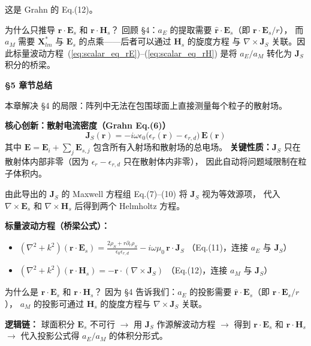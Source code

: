 这是 Grahn 的 Eq.(12)。

\begin{stepbox}{为什么只推导 $\mathbf{r}\cdot\mathbf{E}_s$ 和 $\mathbf{r}\cdot\mathbf{H}_s$？}
回顾 \S4：$a_E$ 的提取需要 $\hat{\mathbf{r}}\cdot\mathbf{E}_s$（即 $\mathbf{r}\cdot\mathbf{E}_s/r$），
而 $a_M$ 需要 $\mathbf{X}_{lm}^*$ 与 $\mathbf{E}_s$ 的点乘——后者可以通过 $\mathbf{H}_s$ 的旋度方程
与 $\nabla\times\mathbf{J}_S$ 关联。因此标量波动方程~(\ref{eq:scalar_eq_rE})--(\ref{eq:scalar_eq_rH})
是将 $a_E/a_M$ 转化为 $\mathbf{J}_S$ 积分的桥梁。
\end{stepbox}

\begin{chaptersummary}

\textbf{§5 章节总结}

本章解决 §4 的局限：阵列中无法在包围球面上直接测量每个粒子的散射场。

\textbf{核心创新：散射电流密度（Grahn Eq.(6)）}
$$
\mathbf{J}_S(\mathbf{r}) = -i\omega\epsilon_0\bigl(\epsilon_r(\mathbf{r}) - \epsilon_{r,d}\bigr)\,\mathbf{E}(\mathbf{r})
$$
其中 $\mathbf{E} = \mathbf{E}_i + \sum_j\mathbf{E}_{s,j}$ 包含所有入射场和散射场的总电场。
\textbf{关键性质：}$\mathbf{J}_S$ 只在散射体内部非零（因为 $\epsilon_r-\epsilon_{r,d}$ 只在散射体内非零），
因此自动将问题域限制在粒子体积内。

由此导出的 $\mathbf{J}_S$ 的 Maxwell 方程组 Eq.(7)--(10) 将 $\mathbf{J}_S$ 视为等效源项，
代入 $\nabla\times\mathbf{E}_s$ 和 $\nabla\times\mathbf{H}_s$ 后得到两个 Helmholtz 方程。

\textbf{标量波动方程（桥梁公式）：}
\begin{itemize}
  \item $\displaystyle(\nabla^2 + k^2)(\mathbf{r}\cdot\mathbf{E}_s) = \frac{2\rho_S+r\partial_r\rho_S}{\epsilon_0\epsilon_{r,d}} - i\omega\mu_0\,\mathbf{r}\cdot\mathbf{J}_S$ \quad （Eq.(11)，连接 $a_E$ 与 $\mathbf{J}_S$）
  \item $\displaystyle(\nabla^2 + k^2)(\mathbf{r}\cdot\mathbf{H}_s) = -\mathbf{r}\cdot(\nabla\times\mathbf{J}_S)$ \quad （Eq.(12)，连接 $a_M$ 与 $\mathbf{J}_S$）
\end{itemize}
为什么是 $\mathbf{r}\cdot\mathbf{E}_s$ 和 $\mathbf{r}\cdot\mathbf{H}_s$？
因为 §4 告诉我们：$a_E$ 的投影需要 $\hat{\mathbf{r}}\cdot\mathbf{E}_s$（即 $\mathbf{r}\cdot\mathbf{E}_s/r$），
$a_M$ 的投影可通过 $\mathbf{H}_s$ 的旋度方程与 $\nabla\times\mathbf{J}_S$ 关联。

\textbf{逻辑链：} 球面积分 $\mathbf{E}_s$ 不可行
$\to$ 用 $\mathbf{J}_S$ 作源解波动方程 $\to$ 得到 $\mathbf{r}\cdot\mathbf{E}_s$ 和 $\mathbf{r}\cdot\mathbf{H}_s$
$\to$ 代入投影公式得 $a_E/a_M$ 的体积分形式。

\end{chaptersummary}

\newpage

